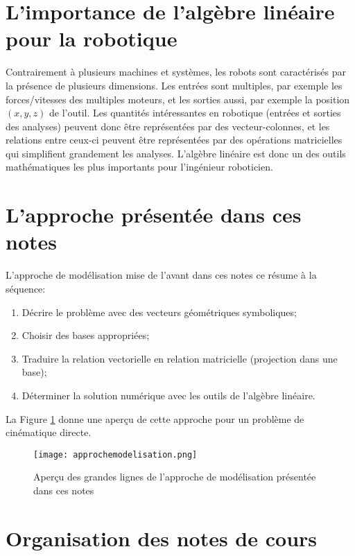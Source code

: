 \section{L'importance de l'algèbre linéaire pour la robotique}

Contrairement à plusieurs machines et systèmes, les robots sont caractérisés par la présence de plusieurs dimensions. Les entrées sont multiples, par exemple les forces/vitesses des multiples moteurs, et les sorties aussi, par exemple la position $(x,y,z)$ de l'outil. Les quantités intéressantes en robotique (entrées et sorties des analyses) peuvent donc être représentées par des vecteur-colonnes, et les relations entre ceux-ci peuvent être représentées par des opérations matricielles qui simplifient grandement les analyses. L'algèbre linéaire est donc un des outils mathématiques les plus importants pour l'ingénieur roboticien. 


\newpage
\section{L'approche présentée dans ces notes}

L'approche de modélisation mise de l'avant dans ces notes ce résume à la séquence:
\begin{enumerate}
	\item Décrire le problème avec des vecteurs géométriques symboliques;
	\item Choisir des bases appropriées;
	\item Traduire la relation vectorielle en relation matricielle (projection dans une base);
	\item Déterminer la solution numérique avec les outils de l'algèbre linéaire.
\end{enumerate}

La Figure \ref{fig:approchemodelisation} donne une aperçu de cette approche pour un problème de cinématique directe.

\begin{figure}[H]
	\centering
		\texttt{[image: approchemodelisation.png]}
	\caption{Aperçu des grandes lignes de l'approche de modélisation présentée dans ces notes}
	\label{fig:approchemodelisation}
\end{figure}


\section{Organisation des notes de cours}

